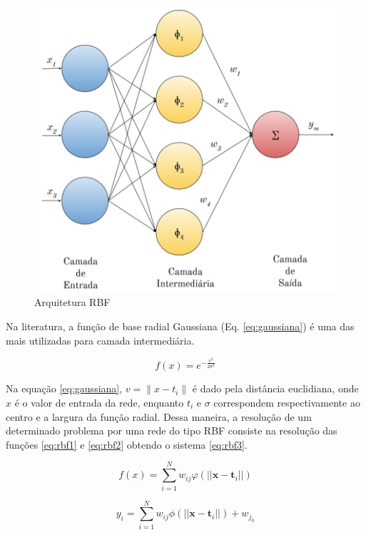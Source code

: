 \documentclass[qual, classic, a4paper]{ufbathesis}
\begin{document}
\begin{figure}[!ht]
\begin{center}
    \includegraphics[scale=1]{imagens/rbf_arq.png}
    \caption{Arquitetura RBF}
    \label{fig:rbg_arq}
\end{center}
\end{figure}

Na literatura, a função de base radial Gaussiana (Eq. \ref{eq:gaussiana}) é uma das mais utilizadas para camada intermediária.

\begin{equation} \label{eq:gaussiana}
    f(x)=e^{-{\frac {v^{2}}{2\sigma^{2}}}}
\end{equation}

Na equação \ref{eq:gaussiana}, $v = \lVert x - t_i \rVert$ é dado pela distância euclidiana, onde $x$ é o valor de entrada da rede, 
enquanto $t_i$ e $\sigma$ correspondem respectivamente ao centro e a largura da função radial. 
Dessa maneira, a resolução de um determinado problema por uma rede do tipo RBF consiste na resolução das funções \ref{eq:rbf1} e
\ref{eq:rbf2} obtendo o sistema \ref{eq:rbf3}.

\begin{equation} \label{eq:rbf1}
    f(x)=\sum _{{i=1}}^{N}w_{ij}\varphi (||{\mathbf  {x}}-{\mathbf  {t}}_{i}||)
\end{equation}

\begin{equation} \label{eq:rbf2}
    y_i=\sum _{{i=1}}^{N}w_{ij}\phi (||{\mathbf  {x}}-{\mathbf  {t}}_{i}||) + w_{j_0}
\end{equation}
\end{document}
